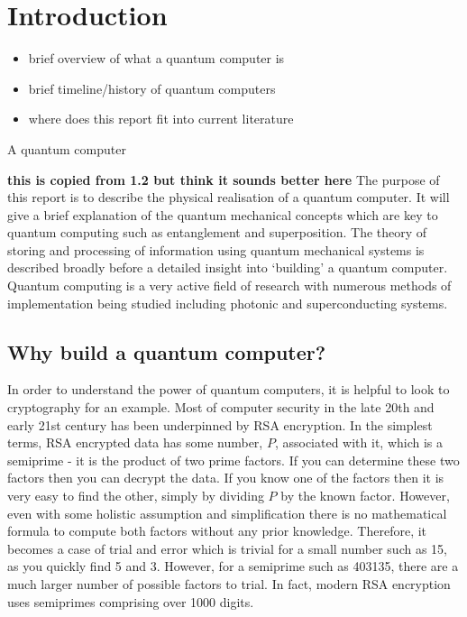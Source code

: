 \section{Introduction}
\begin{itemize}
    \item brief overview of what a quantum computer is
    \item brief timeline/history of quantum computers
    \item where does this report fit into current literature
\end{itemize}

A quantum computer 

{\bf this is copied from 1.2 but think it sounds better here}
The purpose of this report is to describe the physical realisation of a quantum computer. 
It will give a brief explanation of the quantum mechanical concepts which are key to quantum computing such as entanglement and superposition. 
The theory of storing and processing of information using quantum mechanical systems is described broadly before a detailed insight into `building' a quantum computer.
Quantum computing is a very active field of research with numerous methods of implementation being studied including photonic and superconducting systems. 
\subsection{Why build a quantum computer?}
In order to understand the power of quantum computers, it is helpful to look to cryptography for an example. Most of computer security in the late 20th and early 21st century has been underpinned by RSA encryption. In the simplest terms, RSA encrypted data has some number, $P$, associated with it, which is a semiprime - it is the product of two prime factors. If you can determine these two factors then you can decrypt the data. If you know one of the factors then it is very easy to find the other, simply by dividing $P$ by the known factor. However, even with some holistic assumption and simplification there is no mathematical formula to compute both factors without any prior knowledge. Therefore, it becomes a case of trial and error which is trivial for a small number such as 15, as you quickly find 5 and 3. However, for a semiprime such as 403135, there are a much larger number of possible factors to trial. In fact, modern RSA encryption uses semiprimes comprising over 1000 digits.\\

